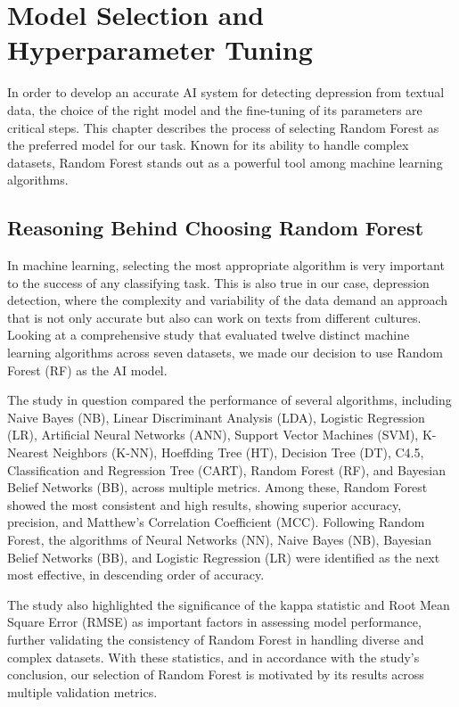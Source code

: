 \chapter{Model Selection and Hyperparameter Tuning}

\label{chap:ch3}

\quad In order to develop an accurate AI system for detecting depression from textual data, the choice of the right model and the fine-tuning of its parameters are critical steps. This chapter describes the process of selecting Random Forest as the preferred model for our task. Known for its ability to handle complex datasets, Random Forest stands out as a powerful tool among machine learning algorithms.

\section{Reasoning Behind Choosing Random Forest}

In machine learning, selecting the most appropriate algorithm is very important to the success of any classifying task. This is also true in our case, depression detection, where the complexity and variability of the data demand an approach that is not only accurate but also can work on texts from different cultures. Looking at a  comprehensive study that evaluated twelve distinct machine learning algorithms across seven datasets\cite{siraj2023performanceModelComparison}, we made our decision to use Random Forest (RF) as the AI model.

The study \cite{siraj2023performanceModelComparison} in question compared the performance of several algorithms, including Naive Bayes (NB), Linear Discriminant Analysis (LDA), Logistic Regression (LR), Artificial Neural Networks (ANN), Support Vector Machines (SVM), K-Nearest Neighbors (K-NN), Hoeffding Tree (HT), Decision Tree (DT), C4.5, Classification and Regression Tree (CART), Random Forest (RF), and Bayesian Belief Networks (BB), across multiple metrics. Among these, Random Forest showed the most consistent and high results, showing superior accuracy, precision, and Matthew’s Correlation Coefficient (MCC). Following Random Forest, the algorithms of Neural Networks (NN), Naive Bayes (NB), Bayesian Belief Networks (BB), and Logistic Regression (LR) were identified as the next most effective, in descending order of accuracy.

The study \cite{siraj2023performanceModelComparison} also highlighted the significance of the kappa statistic and Root Mean Square Error (RMSE) as important factors in assessing model performance, further validating the consistency of Random Forest in handling diverse and complex datasets. With these statistics, and in accordance with the study’s conclusion, our selection of Random Forest is motivated by its results across multiple validation metrics.

